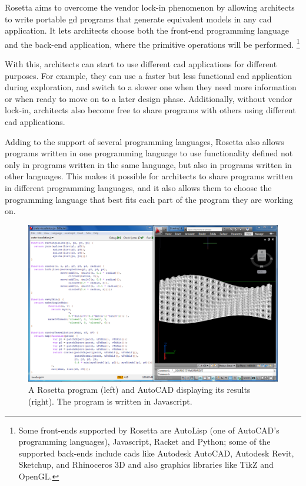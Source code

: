 Rosetta aims to overcome the vendor lock-in phenomenon by allowing architects to write portable \gls{gd} programs that generate equivalent models in any \gls{cad} application.
It lets architects choose both the front-end programming language and the back-end application, where the primitive operations will be performed\cite{de2012modern}.%
\footnote{Some front-ends supported by Rosetta are AutoLisp (one of AutoCAD's programming languages), Javascript, Racket and Python; some of the supported back-ends include \glspl{cad} like Autodesk AutoCAD, Autodesk Revit, Sketchup, and Rhinoceros 3D and also graphics libraries like TikZ and OpenGL.}

With this, architects can start to use different \gls{cad} applications for different purposes.
For example, they can use a faster but less functional \gls{cad} application during exploration, and switch to a slower one when they need more information or when ready to move on to a later design phase.
Additionally, without vendor lock-in, architects also become free to share programs with others using different \gls{cad} applications.

Adding to the support of several programming languages, Rosetta also allows programs written in one programming language to use functionality defined not only in programs written in the same language, but also in programs written in other languages.
This makes it possible for architects to share programs written in different programming languages, and it also allows them to choose the programming language that best fits each part of the program they are working on.

\begin{figure}
	\centering
	\includegraphics[width=1.0\textwidth]{images/rosetta_js_autocad}
	\caption{A Rosetta program (left) and AutoCAD displaying its results (right). The program is written in Javascript.}
	\label{fig:rosetta:ex}
\end{figure}



